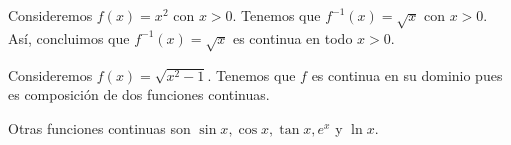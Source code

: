 \begin{eg}
\normalfont Consideremos $\displaystyle f\left(x\right) = x^{2} $ con $\displaystyle x > 0 $. Tenemos que $\displaystyle f^{-1}\left(x\right) = \sqrt{x} $ con $\displaystyle x > 0 $. Así, concluimos que $\displaystyle f^{-1}\left(x\right) = \sqrt{x} $ es continua en todo $\displaystyle x > 0 $.
\end{eg}
\begin{eg}
\normalfont Consideremos $\displaystyle f\left(x\right) = \sqrt{x^{2}-1} $. Tenemos que $\displaystyle f $ es continua en su dominio pues es composición de dos funciones continuas.
\end{eg}
\begin{eg}
\normalfont Otras funciones continuas son $\displaystyle \sin x, \cos x, \tan x, e^{x} $ y $\displaystyle \ln x $.
\end{eg}
